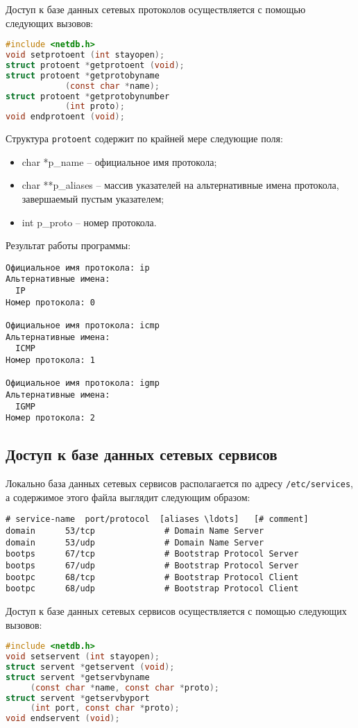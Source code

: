 Доступ к базе данных сетевых протоколов осуществляется с помощью следующих вызовов:
\begin{lstlisting}[language=C]
#include <netdb.h>
void setprotoent (int stayopen);
struct protoent *getprotoent (void);
struct protoent *getprotobyname 
            (const char *name);
struct protoent *getprotobynumber
			(int proto);
void endprotoent (void);
\end{lstlisting}

Структура {\tt protoent} содержит по крайней мере следующие поля:
\begin{itemize}
	\item char  *p\_name -- официальное имя протокола;
	\item char **p\_aliases -- массив указателей на альтернативные имена протокола, завершаемый пустым указателем;
	\item int    p\_proto -- номер протокола.
\end{itemize}



Результат работы программы:
\begin{verbatim}
Официальное имя протокола: ip
Альтернативные имена:
  IP
Номер протокола: 0

Официальное имя протокола: icmp
Альтернативные имена:
  ICMP
Номер протокола: 1

Официальное имя протокола: igmp
Альтернативные имена:
  IGMP
Номер протокола: 2
\end{verbatim}


\subsection{Доступ к базе данных сетевых сервисов}
Локально база данных сетевых сервисов располагается по адресу {\tt /etc/services}, а содержимое этого файла выглядит следующим образом:
\begin{verbatim}
# service-name  port/protocol  [aliases \ldots]   [# comment]
domain		53/tcp				# Domain Name Server
domain		53/udp				# Domain Name Server
bootps		67/tcp				# Bootstrap Protocol Server
bootps		67/udp				# Bootstrap Protocol Server
bootpc		68/tcp				# Bootstrap Protocol Client
bootpc		68/udp				# Bootstrap Protocol Client
\end{verbatim}

Доступ к базе данных сетевых сервисов осуществляется с помощью следующих вызовов:
\begin{lstlisting}[language=C]
#include <netdb.h>
void setservent (int stayopen);
struct servent *getservent (void);
struct servent *getservbyname 
     (const char *name, const char *proto);
struct servent *getservbyport 
     (int port, const char *proto);
void endservent (void);
\end{lstlisting}

